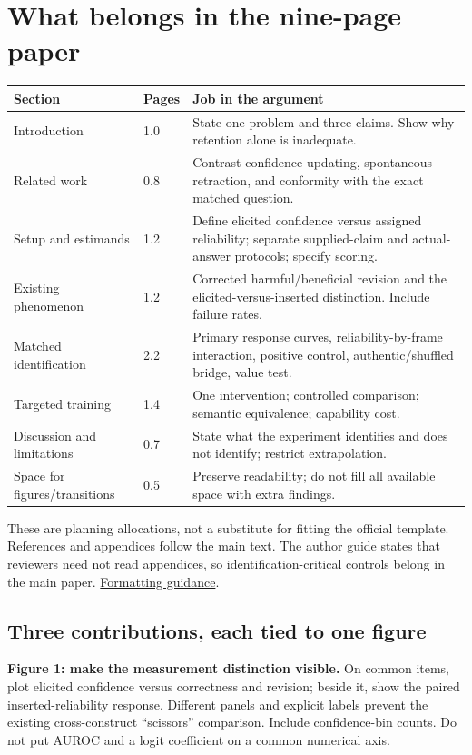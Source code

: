 \documentclass[11pt]{article}
\newcommand{\source}[2]{\href{#1}{#2}}
\begin{document}
\section{What belongs in the nine-page paper}

\begin{tabularx}{\linewidth}{P{.26\linewidth}P{.10\linewidth}Y}
\toprule
Section & Pages & Job in the argument\\
\midrule
Introduction & 1.0 & State one problem and three claims. Show why retention alone is inadequate.\\
Related work & 0.8 & Contrast confidence updating, spontaneous retraction, and conformity with the exact matched question.\\
Setup and estimands & 1.2 & Define elicited confidence versus assigned reliability; separate supplied-claim and actual-answer protocols; specify scoring.\\
Existing phenomenon & 1.2 & Corrected harmful/beneficial revision and the elicited-versus-inserted distinction. Include failure rates.\\
Matched identification & 2.2 & Primary response curves, reliability-by-frame interaction, positive control, authentic/shuffled bridge, value test.\\
Targeted training & 1.4 & One intervention; controlled comparison; semantic equivalence; capability cost.\\
Discussion and limitations & 0.7 & State what the experiment identifies and does not identify; restrict extrapolation.\\
Space for figures/transitions & 0.5 & Preserve readability; do not fill all available space with extra findings.\\
\bottomrule
\end{tabularx}

These are planning allocations, not a substitute for fitting the official template. References and appendices follow the main text. The author guide states that reviewers need not read appendices, so identification-critical controls belong in the main paper. \source{https://iclr.cc/Conferences/2027/AuthorGuidelines}{Formatting guidance}.

\subsection{Three contributions, each tied to one figure}
\textbf{Figure 1: make the measurement distinction visible.} On common items, plot elicited confidence versus correctness and revision; beside it, show the paired inserted-reliability response. Different panels and explicit labels prevent the existing cross-construct ``scissors'' comparison. Include confidence-bin counts. Do not put AUROC and a logit coefficient on a common numerical axis.
\end{document}
